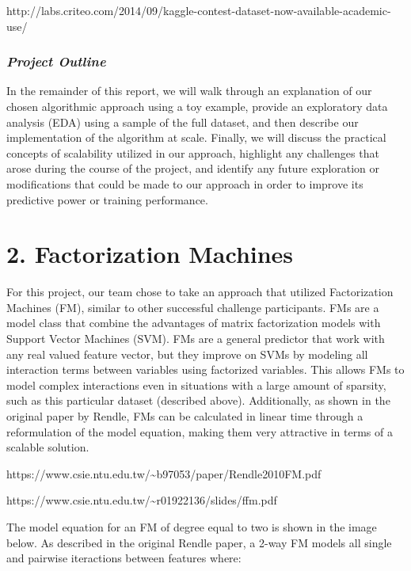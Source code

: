 \documentclass[11pt]{article}
\begin{document}
http://labs.criteo.com/2014/09/kaggle-contest-dataset-now-available-academic-use/

\subsubsection{\texorpdfstring{\emph{Project
Outline}}{Project Outline}}\label{project-outline}

In the remainder of this report, we will walk through an explanation of
our chosen algorithmic approach using a toy example, provide an
exploratory data analysis (EDA) using a sample of the full dataset, and
then describe our implementation of the algorithm at scale. Finally, we
will discuss the practical concepts of scalability utilized in our
approach, highlight any challenges that arose during the course of the
project, and identify any future exploration or modifications that could
be made to our approach in order to improve its predictive power or
training performance.

    \section{2. Factorization Machines}\label{factorization-machines}

For this project, our team chose to take an approach that utilized
Factorization Machines (FM), similar to other successful challenge
participants. FMs are a model class that combine the advantages of
matrix factorization models with Support Vector Machines (SVM). FMs are
a general predictor that work with any real valued feature vector, but
they improve on SVMs by modeling all interaction terms between variables
using factorized variables. This allows FMs to model complex
interactions even in situations with a large amount of sparsity, such as
this particular dataset (described above). Additionally, as shown in the
original paper by Rendle, FMs can be calculated in linear time through a
reformulation of the model equation, making them very attractive in
terms of a scalable solution.

https://www.csie.ntu.edu.tw/\textasciitilde{}b97053/paper/Rendle2010FM.pdf

https://www.csie.ntu.edu.tw/\textasciitilde{}r01922136/slides/ffm.pdf

The model equation for an FM of degree equal to two is shown in the
image below. As described in the original Rendle paper, a 2-way FM
models all single and pairwise iteractions between features where:
\end{document}
